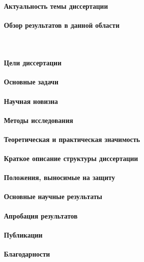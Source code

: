 \paragraph{Актуальность темы диссертации}
\lipsum[1]

\paragraph{Обзор результатов в данной области}
\lipsum[1]~\cite{bib1}

\paragraph{Цели диссертации}
\lipsum[1]

\paragraph{Основные задачи}
\lipsum[1]


\paragraph{Научная новизна}
\lipsum[1]

\paragraph{Методы исследования}
\lipsum[1]

\paragraph{Теоретическая и практическая значимость}
\lipsum[1]

\paragraph{Краткое описание структуры диссертации}
\lipsum[1]

\paragraph{Положения, выносимые на защиту}
\lipsum[1]

\paragraph{Основные научные результаты}
\lipsum[1]

\paragraph{Апробация результатов}
\lipsum[1]

\paragraph{Публикации}
\lipsum[1]

\paragraph{Благодарности}
\lipsum[1]
